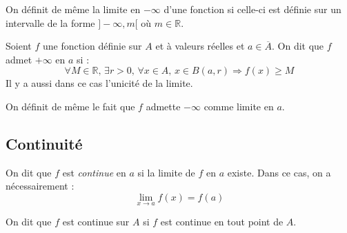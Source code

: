\documentclass[a4paper,10pt]{report}
\begin{document}
\begin{Remarque}{} On définit de même la limite en $- \infty$ d'une fonction si celle-ci est définie sur un intervalle de la forme $]- \infty, m[$ où $m \in \mathbb{R}$.
\end{Remarque}
%
%

\begin{Definition}{} Soient $f$ une fonction définie sur $A$ et à valeurs réelles et $a \in \overline{A}$. On dit que $f$ admet $+ \infty$ en $a$ si :
$$ \forall M \in \mathbb{R}, \, \exists r > 0, \, \forall x \in A, \, x \in B(a,r) \Rightarrow f(x) \geq M$$
Il y a aussi dans ce cas l'unicité de la limite.
\end{Definition}

\begin{Remarque}{} On définit de même le fait que $f$ admette $- \infty$ comme limite en $a$.
\end{Remarque}

\subsection{Continuité}

\begin{TheoremeDefinition}{} On dit que $f$ est \emph{continue} en $a$ si la limite de $f$ en $a$ existe. Dans ce cas, on a nécessairement :
$$ \lim_{x \rightarrow a} f(x) = f(a) $$
\end{TheoremeDefinition}

\begin{Definition}{} On dit que $f$ est continue sur $A$ si $f$ est continue en tout point de $A$.
\end{Definition}
\end{document}

